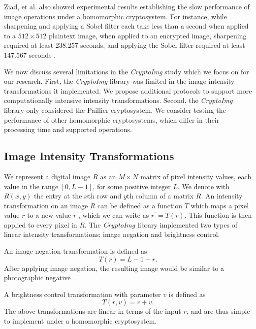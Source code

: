 Ziad, et al. also showed experimental results establishing the slow performance of image operations under a homomorphic cryptosystem. For instance, while sharpening and applying a Sobel filter each take less than a second when applied to a $512\times 512$ plaintext image, when applied to an encrypted image, sharpening required at least 238.257 seconds, and applying the Sobel filter required at least 147.567 seconds \cite{ziad_cryptoimg:_2016}.

We now discuss several limitations in the \textit{CryptoImg} study which we focus on for our research. First, the \textit{CryptoImg} library was limited in the image intensity transformations it implemented. We propose additional protocols to support more computationally intensive intensity transformations.
Second, the \textit{CryptoImg} library only considered the Paillier cryptosystem. We consider testing the performance of other homomorphic cryptosystems, which differ in their processing time and supported operations.

\subsection{Image Intensity Transformations}
We represent a digital image $R$ as an $M \times N$ matrix of pixel intensity values, each value in the range $\left[0, L-1\right]$, for some positive integer $L$. We denote with $R(x,y)$ the entry at the $x$th row and $y$th column of a matrix $R$.
An intensity transformation on an image $R$ can be defined as a function $T$ which maps a pixel value $r$ to a new value $r^\prime$, which we can write as $r^\prime = T\left(r\right)$. This function is then applied to every pixel in $R$.
The \textit{CryptoImg} library implemented two types of linear intensity transformations: image negation and brightness control.

An image negation transformation is defined as
\begin{equation}
    T\left(r\right) = L-1-r.
\end{equation}
After applying image negation, the resulting image would be similar to a photographic negative~\cite{gonzalez_digital_2008}.

A brightness control transformation with parameter $v$ is defined as
\begin{equation}
    T\left(r,v\right) = r+v.
\end{equation}
The above transformations are linear in terms of the input $r$, and are thus simple to implement under a homomorphic cryptosystem.

